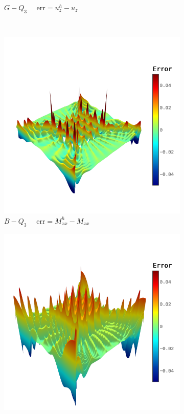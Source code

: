 \begin{figure}[h]
\begin{subfigure}[t]{.45\linewidth}
		\caption{$G-Q_3$ $\quad \text{err} = u_z^h-u_z$}
	\end{subfigure}\\
	\begin{subfigure}[t]{.45\linewidth}
		\center
		\includegraphics[scale=.3,trim={0cm 1.5cm 0cm 1.5cm},clip]{e_Mxx}
		\caption{$B-Q_3$ $\quad \text{err} = M_{xx}^h-M_{xx}$}
	\end{subfigure}
	\begin{subfigure}[t]{.45\linewidth}
		\center
		\includegraphics[scale=.3,trim={0cm 1.5cm 0cm 1.5cm},clip]{g_Mxx}

\end{subfigure}
\end{figure}
